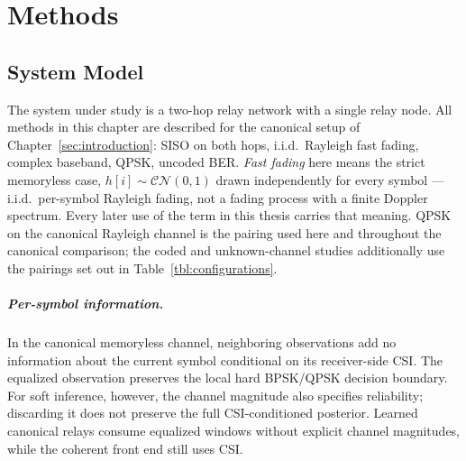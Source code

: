 \chapter{Methods}\label{sec:methods}

\section{System Model}\label{sec:system-model-1}

The system under study is a two-hop relay network with a single relay node. All methods in this chapter are described for the canonical setup of Chapter~\ref{sec:introduction}: SISO on both hops, i.i.d.\ Rayleigh fast fading, complex baseband, QPSK, uncoded BER. \emph{Fast fading} here means the strict memoryless case, $h[i] \sim \mathcal{CN}(0,1)$ drawn independently for every symbol --- i.i.d.\ per-symbol Rayleigh fading, not a fading process with a finite Doppler spectrum. Every later use of the term in this thesis carries that meaning. QPSK on the canonical Rayleigh channel is the pairing used here and throughout the canonical comparison; the coded and unknown-channel studies additionally use the pairings set out in Table~\ref{tbl:configurations}.

\paragraph{Per-symbol information.} In the canonical memoryless channel, neighboring observations add no information about the current symbol conditional on its receiver-side CSI. The equalized observation preserves the local hard BPSK/QPSK decision boundary. For soft inference, however, the channel magnitude also specifies reliability; discarding it does not preserve the full CSI-conditioned posterior. Learned canonical relays consume equalized windows without explicit channel magnitudes, while the coherent front end still uses CSI.


